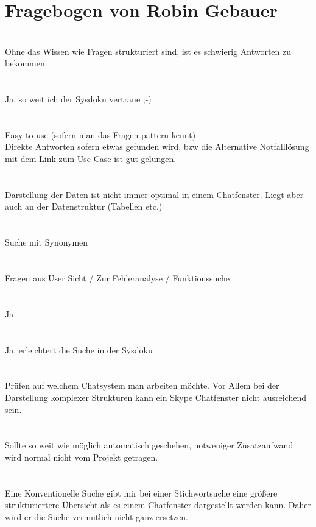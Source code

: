 \section{Fragebogen von Robin Gebauer}
\label{ch:evaluation:robin}
\speaker{\frageEins} \\
Ohne das Wissen wie Fragen strukturiert sind, ist es schwierig Antworten zu bekommen. \\\\
\speaker{\frageZwei} \\
Ja, so weit ich der Sysdoku vertraue ;-) \\\\
\speaker{\frageDrei} \\
Easy to use (sofern man das Fragen-pattern kennt) \\
Direkte Antworten sofern etwas gefunden wird, bzw die Alternative Notfalllösung mit dem Link zum Use Case ist gut gelungen. \\\\
\speaker{\frageVier} \\
Darstellung der Daten ist nicht immer optimal in einem Chatfenster. Liegt aber auch an der Datenstruktur (Tabellen etc.) \\\\
\speaker{\frageFuenf} \\
Suche mit Synonymen \\\\
\speaker{\frageSechs} \\
Fragen aus User Sicht / Zur Fehleranalyse / Funktionssuche \\\\
\speaker{\frageSieben} \\
Ja \\\\
\speaker{\frageAcht} \\
Ja, erleichtert die Suche in der Sysdoku \\\\
\speaker{\frageNeun} \\
Prüfen auf welchem Chatsystem man arbeiten möchte. Vor Allem bei der Darstellung komplexer Strukturen kann ein Skype Chatfenster nicht ausreichend sein. \\\\
\speaker{\frageZehn} \\
Sollte so weit wie möglich automatisch geschehen, notweniger Zusatzaufwand wird normal nicht vom Projekt getragen. \\\\
\speaker{\frageElf} \\
Eine Konventionelle Suche gibt mir bei einer Stichwortsuche eine größere strukturiertere Übersicht als es einem Chatfenster dargestellt werden kann. Daher wird er die Suche vermutlich nicht ganz ersetzen.